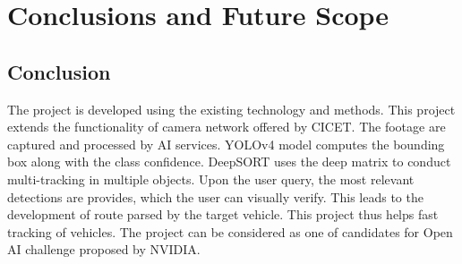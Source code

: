 \chapter{Conclusions and Future Scope}

\section{Conclusion}
The project is developed using the existing technology and methods. This project extends the functionality of camera network offered by CICET. The footage are captured and processed by AI services. YOLOv4 model computes the bounding box along with the class confidence. DeepSORT uses the deep matrix to conduct multi-tracking in multiple objects. Upon the user query, the most relevant detections are provides, which the user can visually verify. This leads to the development of route parsed by the target vehicle. This project thus helps fast tracking of vehicles. The project can be considered as one of candidates for Open AI challenge proposed by NVIDIA. 

